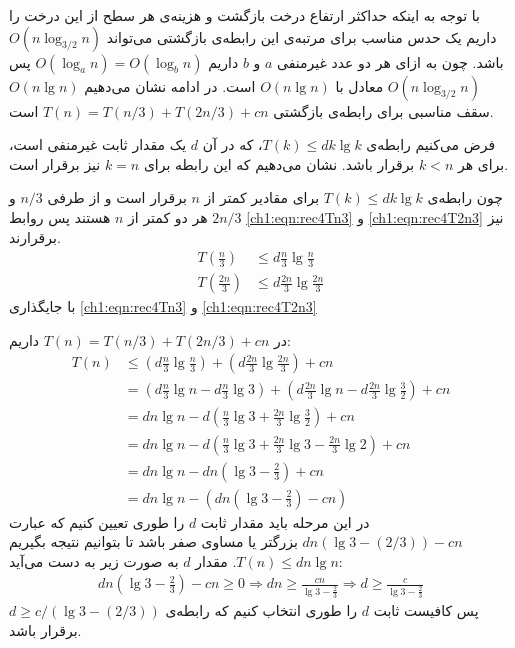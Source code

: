 {{با توجه به اینکه حداکثر ارتفاع درخت بازگشت و هزینه‌ی هر سطح از این درخت را داریم یک حدس مناسب برای مرتبه‌ی این رابطه‌ی بازگشتی می‌تواند {$O(n\log_{3/2}{n})$} باشد. چون به ازای هر دو عدد غیرمنفی {$a$} و {$b$} داریم {$O(\log_{a}{n})=O(\log_{b}{n})$} پس {$O(n\log_{3/2}{n})$} معادل با {$O(n\lg n)$} است. در ادامه نشان می‌دهیم {$O(n\lg n)$} سقف مناسبی برای رابطه‌ی بازگشتی {$T(n)=T(n/3)+T(2n/3)+cn$} است.

فرض می‌کنیم رابطه‌ی {$T(k)\leqslant d k\lg k$}، که در آن {$d$} یک مقدار ثابت غیرمنفی است، برای هر {$k<n$} برقرار باشد. نشان می‌دهیم که این رابطه برای {$k=n$} نیز برقرار است.

چون رابطه‌ی {$T(k)\leqslant d k\lg k$} برای مقادیر کمتر از {$n$}  برقرار است و از طرفی {$n/3$} و {$2n/3$} هر دو کمتر از {$n$} هستند پس روابط {\eqref{ch1:eqn:rec4Tn3}} و {\eqref{ch1:eqn:rec4T2n3}} نیز برقرارند.
\begin{align}
T\left(\frac{n}{3}\right) &\leq d\frac{n}{3}\lg \frac{n}{3}\label{ch1:eqn:rec4Tn3}\\
T\left(\frac{2n}{3}\right) &\leq d\frac{2n}{3}\lg \frac{2n}{3}\label{ch1:eqn:rec4T2n3}
\end{align}
با جایگذاری {\eqref{ch1:eqn:rec4Tn3}} و {\eqref{ch1:eqn:rec4T2n3}}} در {$T(n)=T(n/3)+T(2n/3)+cn$} داریم:
\begin{align*}
T(n) &\leq \left( d\frac{n}{3}\lg \frac{n}{3} \right) + \left( d\frac{2n}{3}\lg \frac{2n}{3} \right) + cn\\
		&= \left( d\frac{n}{3}\lg n - d\frac{n}{3}\lg 3 \right) + \left( d\frac{2n}{3}\lg n - d\frac{2n}{3}\lg \frac{3}{2}\right) + cn \\
		&= dn\lg n - d \left( \frac{n}{3}\lg 3 + \frac{2n}{3}\lg \frac{3}{2} \right) + cn \\		
		&= dn\lg n - d \left( \frac{n}{3}\lg 3 + \frac{2n}{3}\lg 3 - \frac{2n}{3}\lg 2 \right) + cn \\		
		&= dn\lg n - dn \left( \lg 3 - \frac{2}{3} \right) + cn\\
		&= dn\lg n - \left(dn \left( \lg 3 - \frac{2}{3} \right) - cn \right)
\end{align*}
در این مرحله باید مقدار ثابت {$d$} را طوری تعیین کنیم که عبارت {$dn( \lg 3 - (2/3)) - cn$} بزرگتر یا مساوی صفر باشد تا بتوانیم نتیجه بگیریم {$T(n)\leqslant dn\lg n$}. مقدار {$d$} به صورت زیر به دست می‌آید:
\begin{align*}
dn \left( \lg 3 - \frac{2}{3} \right) - cn \geq 0 \Rightarrow dn \geq \frac{cn}{\lg 3 - \frac{2}{3}} \Rightarrow d \geq \frac{c}{\lg 3 - \frac{2}{3}}
\end{align*}
پس کافیست ثابت {$d$} را طوری انتخاب کنیم که رابطه‌ی {$d \geqslant c/(\lg 3 - (2/3))$} برقرار باشد.

}
